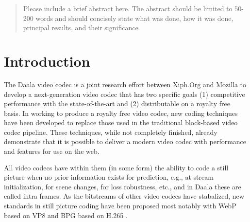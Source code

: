 \documentclass[conference, 10pt]{IEEEtran}
\begin{document}




\maketitle


\begin{abstract}
Please include a brief abstract here. The abstract should be limited to 50-200 words and should concisely state what was done, how it was done, principal results, and their significance.
\end{abstract}





%
\IEEEpeerreviewmaketitle



\section{Introduction}
The Daala video codec is a joint research effort between Xiph.Org and Mozilla
 to develop a next-generation video codec that has two specific goals (1)
 competitive performance with the state-of-the-art and (2) distributable on
 a royalty free basis.
In working to produce a royalty free video codec, new coding techniques have
 been developed to replace those used in the traditional block-based video
 codec pipeline.
These techniques, while not completely finished, already demonstrate that it
 is possible to deliver a modern video codec with performance and features
 for use on the web.

All video codecs have within them (in some form) the ability to code a still
 picture when no prior information exists for prediction, e.g., at stream
 initialization, for scene changes, for loss robustness, etc., and in Daala
 these are called intra frames.
As the bitstreams of other video codecs have stabalized, new standards in still
 picture coding have been proposed most notably with WebP based on VP8
 \cite{WebPWebsite} and BPG based on H.265 \cite{BPGWebsite}.
\end{document}
